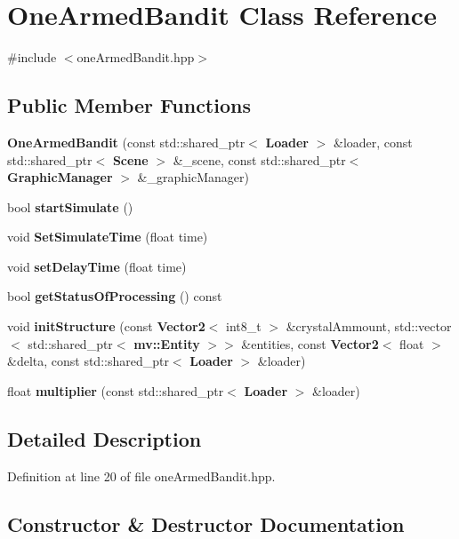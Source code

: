 \section{One\+Armed\+Bandit Class Reference}
\label{class_one_armed_bandit}


{\ttfamily \#include $<$one\+Armed\+Bandit.\+hpp$>$}

\subsection*{Public Member Functions}
\begin{DoxyCompactItemize}
\item 
\textbf{ One\+Armed\+Bandit} (const std\+::shared\+\_\+ptr$<$ \textbf{ Loader} $>$ \&loader, const std\+::shared\+\_\+ptr$<$ \textbf{ Scene} $>$ \&\+\_\+scene, const std\+::shared\+\_\+ptr$<$ \textbf{ Graphic\+Manager} $>$ \&\+\_\+graphic\+Manager)
\item 
bool \textbf{ start\+Simulate} ()
\item 
void \textbf{ Set\+Simulate\+Time} (float time)
\item 
void \textbf{ set\+Delay\+Time} (float time)
\item 
bool \textbf{ get\+Status\+Of\+Processing} () const
\item 
void \textbf{ init\+Structure} (const \textbf{ Vector2}$<$ int8\+\_\+t $>$ \&crystal\+Ammount, std\+::vector$<$ std\+::shared\+\_\+ptr$<$ \textbf{ mv\+::\+Entity} $>$$>$ \&entities, const \textbf{ Vector2}$<$ float $>$ \&delta, const std\+::shared\+\_\+ptr$<$ \textbf{ Loader} $>$ \&loader)
\item 
float \textbf{ multiplier} (const std\+::shared\+\_\+ptr$<$ \textbf{ Loader} $>$ \&loader)
\end{DoxyCompactItemize}


\subsection{Detailed Description}


Definition at line 20 of file one\+Armed\+Bandit.\+hpp.



\subsection{Constructor \& Destructor Documentation}
\mbox{\label{class_one_armed_bandit_aa2df8b31d69a59bbf11dd8f8ea71b9a1}} 
